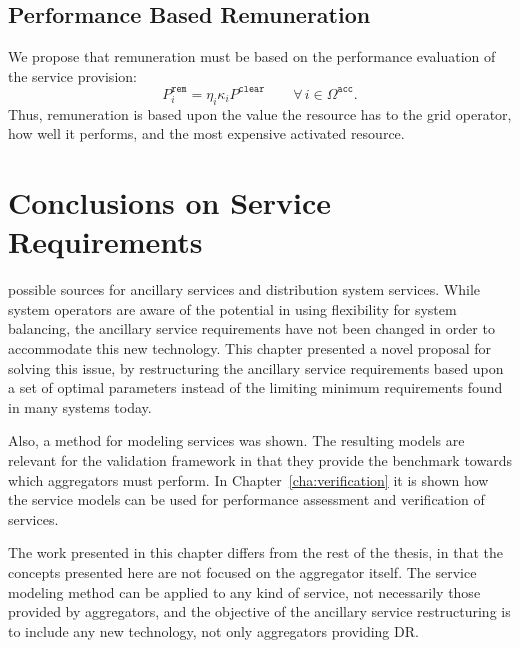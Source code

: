 \subsection*{Performance Based Remuneration}
We propose that remuneration must be based on the performance evaluation of the service provision:
\begin{equation}
	P^\mathtt{rem}_i = \eta_i\kappa_i  P^\mathtt{clear} \qquad \forall \, i \in \Omega^\mathtt{acc}.
\end{equation}
Thus, remuneration is based upon the value the resource has to the grid operator, how well it performs, and the most expensive activated resource.


\section{Conclusions on Service Requirements} %
\label{sec:ConclusionsServiceRequirements}
 possible sources for ancillary services and distribution system services. While system operators are aware of the potential in using flexibility for system balancing, the ancillary service requirements have not been changed in order to accommodate this new technology. This chapter presented a novel proposal for solving this issue, by restructuring the ancillary service requirements based upon a set of optimal parameters instead of the limiting minimum requirements found in many systems today.

Also, a method for modeling services was shown. The resulting models are relevant for the validation framework in that they provide the benchmark towards which aggregators must perform. In Chapter~\ref{cha:verification} it is shown how the service models can be used for performance assessment and verification of services.

The work presented in this chapter differs from the rest of the thesis, in that the concepts presented here are not focused on the aggregator itself. The service modeling method can be applied to any kind of service, not necessarily those provided by aggregators, and the objective of the ancillary service restructuring is to include any new technology, not only aggregators providing DR.



